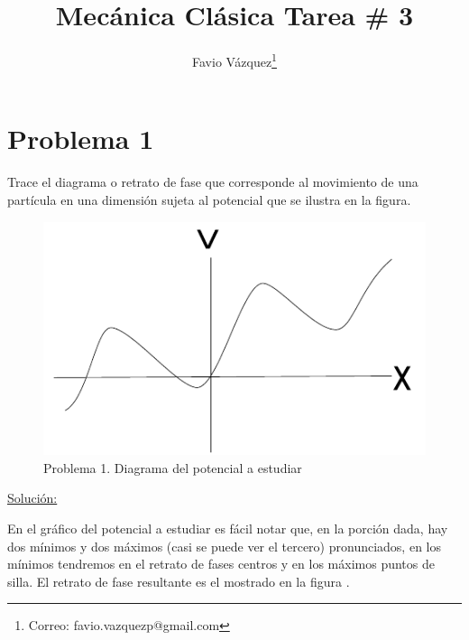 \documentclass[a4paper,10pt]{article}
\title{Mecánica Clásica Tarea \# 3}
\author{Favio Vázquez\thanks{Correo: favio.vazquezp@gmail.com}}\affil{Instituto de Ciencias Nucleares. Universidad Nacional Autónoma de México.}
\date{}
\numberwithin{equation}{section}
\begin{document}
\makeatletter
\def\@maketitle{%
  \newpage
  \null
  \vskip 2em%
  \begin{center}%
  \let \footnote \thanks
    {\Large\bfseries \@title \par}%
    \vskip 1.5em%
    {\normalsize
      \lineskip .5em%
      \begin{tabular}[t]{c}%
        \@author
      \end{tabular}\par}%
    \vskip 1em%
    {\normalsize \@date}%
  \end{center}%
  \par
  \vskip 1.5em}
\makeatother

\maketitle

\section{Problema 1}

Trace el diagrama o retrato de fase que corresponde al movimiento de una
partícula en una dimensión sujeta al potencial que se ilustra en la 
figura.

\begin{figure}[H]
 \center 
 \includegraphics[scale=0.5]{problema1fig1}
 \caption{Problema 1. Diagrama del potencial a estudiar}
\end{figure}

\vspace{.3cm}

\underline{Solución:} \vspace{.3cm}

En el gráfico del potencial a estudiar es fácil notar que, en la porción dada, hay 
dos mínimos y dos máximos (casi se puede ver el tercero) pronunciados, en los mínimos tendremos en el retrato 
de fases centros y en los máximos puntos de silla. El retrato de fase resultante es 
el mostrado en la figura .
\end{document}

